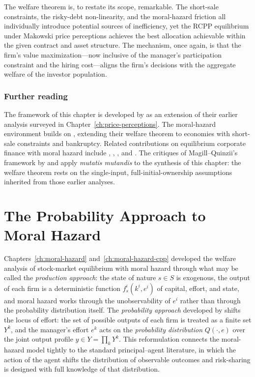 \documentclass[11pt,a4paper,oneside]{book}
\theoremstyle{plain}
\theoremstyle{definition}
\theoremstyle{remark}
\numberwithin{equation}{chapter}
\begin{document}
The welfare theorem is, to restate its scope, remarkable.
The short-sale constraints, the risky-debt non-linearity, and the moral-hazard friction all individually introduce potential sources of inefficiency, yet the RCPP equilibrium under Makowski price perceptions achieves the best allocation achievable within the given contract and asset structure.
The mechanism, once again, is that the firm's value maximization---now inclusive of the manager's participation constraint and the hiring cost---aligns the firm's decisions with the aggregate welfare of the investor population.

\subsection{Further reading}

The framework of this chapter is developed by \citet{BisinGottardiRuta2014} as an extension of their earlier analysis surveyed in Chapter~\ref{ch:price-perceptions}.
The moral-hazard environment builds on \citet{MagillQuinzii2002}, extending their welfare theorem to economies with short-sale constraints and bankruptcy.
Related contributions on equilibrium corporate finance with moral hazard include \citet{KihlstromMatthews1990}, \citet{Kocherlakota1998}, \citet{BisinGottardiRampini2008}, and \citet{AcharyaBisin2009}.
The critiques of Magill--Quinzii's framework by \citet{CalcagnoWagner2006} and \citet{QuigginChambers2006} apply \emph{mutatis mutandis} to the synthesis of this chapter: the welfare theorem rests on the single-input, full-initial-ownership assumptions inherited from those earlier analyses.

\chapter{The Probability Approach to Moral Hazard}
\label{ch:prob-approach}

Chapters~\ref{ch:moral-hazard} and~\ref{ch:moral-hazard-cpp} developed the welfare analysis of stock-market equilibrium with moral hazard through what may be called the \emph{production approach}: the state of nature $s \in S$ is exogenous, the output of each firm is a deterministic function $f^i_s(k^i, e^i)$ of capital, effort, and state, and moral hazard works through the unobservability of $e^i$ rather than through the probability distribution itself.
The \emph{probability approach} developed by \citet{MagillQuinzii2008} shifts the locus of effort: the set of possible outputs of each firm is treated as a finite set $Y^k$, and the manager's effort $e^k$ acts on the \emph{probability distribution} $Q(\cdot, e)$ over the joint output profile $y \in Y = \prod_k Y^k$.
This reformulation connects the moral-hazard model tightly to the standard principal--agent literature, in which the action of the agent shifts the distribution of observable outcomes and risk-sharing is designed with full knowledge of that distribution.
\end{document}
